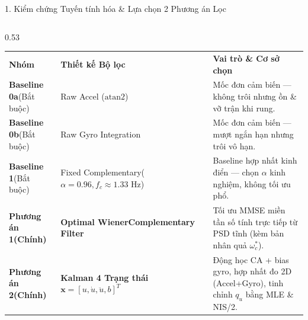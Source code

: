 \documentclass[aspectratio=169,8pt]{beamer}
\begin{document}
\begin{frame}{1. Kiểm chứng Tuyến tính hóa \& Lựa chọn 2 Phương án Lọc}
\begin{columns}[T,totalwidth=\textwidth]
\begin{column}{0.53\textwidth}
{\begin{tabular}{p{1.55cm} p{2.25cm} p{3.55cm}}
        \rowcolor{hustred}
        \textbf{\color{white}Nhóm} & \textbf{\color{white}Thiết kế Bộ lọc} & \textbf{\color{white}Vai trò \& Cơ sở chọn} \\
        \textbf{Baseline 0a}\newline (Bắt buộc) & Raw Accel ($\mathrm{atan2}$) & Mốc đơn cảm biến — không trôi nhưng ồn \& vỡ trận khi rung. \\
        \rowcolor{lightbg}
        \textbf{Baseline 0b}\newline (Bắt buộc) & Raw Gyro Integration & Mốc đơn cảm biến — mượt ngắn hạn nhưng trôi vô hạn. \\
        \textbf{Baseline 1}\newline (Bắt buộc) & Fixed Complementary\newline ($\alpha=0.96, f_c\approx 1.33\text{ Hz}$) & Baseline hợp nhất kinh điển — chọn $\alpha$ kinh nghiệm, không tối ưu phổ. \\
        \rowcolor{greentint}
        \textbf{Phương án 1}\newline \textbf{(Chính)} & \textbf{Optimal Wiener}\newline \textbf{Complementary Filter} & Tối ưu MMSE miền tần số tính trực tiếp từ PSD tĩnh (kèm bản nhân quả $\omega_c^*$). \\
        \rowcolor{bluetint}
        \textbf{Phương án 2}\newline \textbf{(Chính)} & \textbf{Kalman 4 Trạng thái}\newline $\mathbf{x}=[u,\dot{u},\ddot{u},b]^T$ & Động học CA + bias gyro, hợp nhất đo 2D (Accel+Gyro), tinh chỉnh $q_u$ bằng MLE \& NIS/2. \\
        \bottomrule
      \end{tabular}}
    \end{column}
  \end{columns}
\end{frame}
\end{document}
